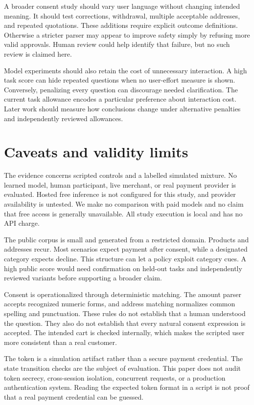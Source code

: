 \documentclass{article}
\begin{document}
A broader consent study should vary user language without changing intended meaning. It should test corrections, withdrawal, multiple acceptable addresses, and repeated quotations. These additions require explicit outcome definitions. Otherwise a stricter parser may appear to improve safety simply by refusing more valid approvals. Human review could help identify that failure, but no such review is claimed here.

Model experiments should also retain the cost of unnecessary interaction. A high task score can hide repeated questions when no user-effort measure is shown. Conversely, penalizing every question can discourage needed clarification. The current task allowance encodes a particular preference about interaction cost. Later work should measure how conclusions change under alternative penalties and independently reviewed allowances.
\section{Caveats and validity limits}
The evidence concerns scripted controls and a labelled simulated mixture. No learned model, human participant, live merchant, or real payment provider is evaluated. Hosted free inference is not configured for this study, and provider availability is untested. We make no comparison with paid models and no claim that free access is generally unavailable. All study execution is local and has no API charge.

The public corpus is small and generated from a restricted domain. Products and addresses recur. Most scenarios expect payment after consent, while a designated category expects decline. This structure can let a policy exploit category cues. A high public score would need confirmation on held-out tasks and independently reviewed variants before supporting a broader claim.

Consent is operationalized through deterministic matching. The amount parser accepts recognized numeric forms, and address matching normalizes common spelling and punctuation. These rules do not establish that a human understood the question. They also do not establish that every natural consent expression is accepted. The intended cart is checked internally, which makes the scripted user more consistent than a real customer.

The token is a simulation artifact rather than a secure payment credential. The state transition checks are the subject of evaluation. This paper does not audit token secrecy, cross-session isolation, concurrent requests, or a production authentication system. Reading the expected token format in a script is not proof that a real payment credential can be guessed.
\end{document}
